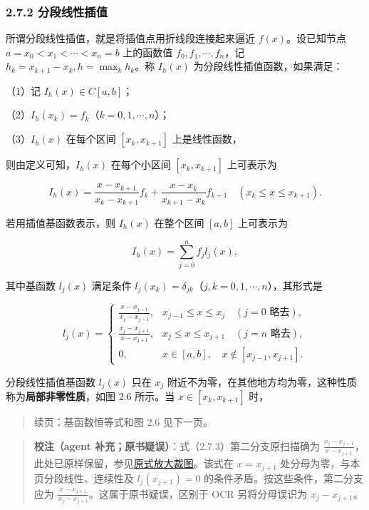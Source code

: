 \documentclass[
  10pt,
  fontset=fandol]{ctexart}
\begin{document}
\subsubsection{2.7.2 分段线性插值}\label{ux5206ux6bb5ux7ebfux6027ux63d2ux503c}

所谓分段线性插值，就是将插值点用折线段连接起来逼近 \(f(x)\)。设已知节点 \(a=x_0<x_1<\cdots<x_n=b\) 上的函数值 \(f_0,f_1,\cdots,f_n\)，记 \(h_k=x_{k+1}-x_k,h=\max_k h_k\)。称 \(I_h(x)\) 为分段线性插值函数，如果满足：

（1）记 \(I_h(x)\in C[a,b]\)；

（2）\(I_h(x_k)=f_k\)（\(k=0,1,\cdots,n\)）；

（3）\(I_h(x)\) 在每个区间 \([x_k,x_{k+1}]\) 上是线性函数，

则由定义可知，\(I_h(x)\) 在每个小区间 \([x_k,x_{k+1}]\) 上可表示为

\[I_h(x)=\frac{x-x_{k+1}}{x_k-x_{k+1}}f_k+\frac{x-x_k}{x_{k+1}-x_k}f_{k+1}\quad(x_k\leqslant x\leqslant x_{k+1}).\tag{2.7.1}\]

若用插值基函数表示，则 \(I_h(x)\) 在整个区间 \([a,b]\) 上可表示为

\[I_h(x)=\sum_{j=0}^n f_jl_j(x),\tag{2.7.2}\]

其中基函数 \(l_j(x)\) 满足条件 \(l_j(x_k)=\delta_{jk}\)（\(j,k=0,1,\cdots,n\)），其形式是

\[l_j(x)=\begin{cases}
\displaystyle\frac{x-x_{j-1}}{x_j-x_{j-1}},&x_{j-1}\leqslant x\leqslant x_j\quad(j=0\text{ 略去}),\\[6pt]
\displaystyle\frac{x_j-x_{j+1}}{x-x_{j+1}},&x_j\leqslant x\leqslant x_{j+1}\quad(j=n\text{ 略去}),\\[6pt]
0,&x\in[a,b],\quad x\notin[x_{j-1},x_{j+1}].
\end{cases}\tag{2.7.3}\]

分段线性插值基函数 \(l_j(x)\) 只在 \(x_j\) 附近不为零，在其他地方均为零，这种性质称为\textbf{局部非零性质}，如图 2.6 所示。当 \(x\in[x_k,x_{k+1}]\) 时，

\begin{quote}
续页：基函数恒等式和图 2.6 见下一页。
\end{quote}

\begin{quote}
\textbf{校注（agent 补充；原书疑误）}：式（2.7.3）第二分支原扫描确为 \(\frac{x_j-x_{j+1}}{x-x_{j+1}}\)，此处已原样保留，参见\href{../assets/ch02b/pdf-046-eq-2-7-3-detail.png}{原式放大裁图}。该式在 \(x=x_{j+1}\) 处分母为零，与本页分段线性、连续性及 \(l_j(x_{j+1})=0\) 的条件矛盾。按这些条件，第二分支应为 \(\frac{x-x_{j+1}}{x_j-x_{j+1}}\)。这属于原书疑误，区别于 OCR 另将分母误识为 \(x_j-x_{j+1}\)。
\end{quote}
\end{document}
